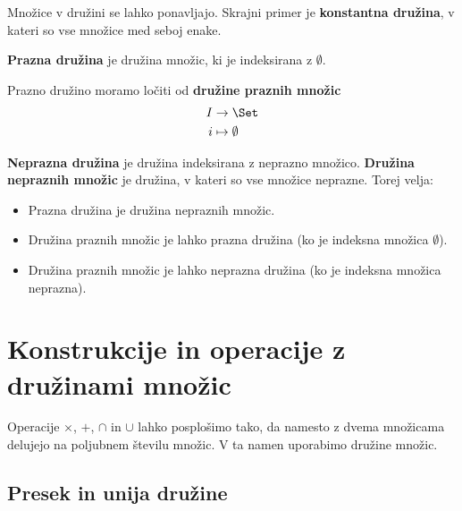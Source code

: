 \begin{primer}
  Množice v družini se lahko ponavljajo. Skrajni primer je \textbf{konstantna družina}, v kateri so vse množice med seboj enake.
\end{primer}

\begin{primer}
  \textbf{Prazna družina} je družina množic, ki je indeksirana z $\emptyset$.
\end{primer}

\begin{primer}
  Prazno družino moramo ločiti od \textbf{družine praznih množic}
  \begin{align*}
    I &\to \Set \\
    i &\mapsto \emptyset
  \end{align*}
\end{primer}

\begin{primer}
  \textbf{Neprazna družina} je družina indeksirana z neprazno množico.
  \textbf{Družina nepraznih množic} je družina, v kateri so vse množice neprazne.
  Torej velja:
  \begin{itemize}
  \item Prazna družina je družina nepraznih množic.
  \item Družina praznih množic je lahko prazna družina (ko je indeksna množica $\emptyset$).
  \item Družina praznih množic je lahko neprazna družina (ko je indeksna množica neprazna).
  \end{itemize}
\end{primer}


\section{Konstrukcije in operacije z družinami množic}

Operacije $\times$, $+$, $\cap$ in $\cup$ lahko posplošimo tako, da namesto z dvema
množicama delujejo na poljubnem številu množic. V ta namen uporabimo družine
množic.

\subsection{Presek in unija družine}

